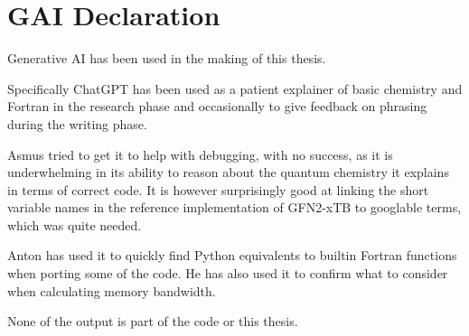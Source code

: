 \chapter{GAI Declaration}
Generative AI has been used in the making of this thesis.

Specifically ChatGPT has been used as a patient explainer of basic chemistry and Fortran in the research phase and occasionally to give feedback on phrasing during the writing phase.

Asmus tried to get it to help with debugging, with no success, as it is underwhelming in its ability to reason about the quantum chemistry it explains in terms of correct code. 
It is however surprisingly good at linking the short variable names in the reference implementation of GFN2-xTB to googlable terms, which was quite needed.

Anton has used it to quickly find Python equivalents to builtin Fortran functions when porting some of the code. He has also used it to confirm what to consider when calculating memory bandwidth.
 
None of the output is part of the code or this thesis. 



